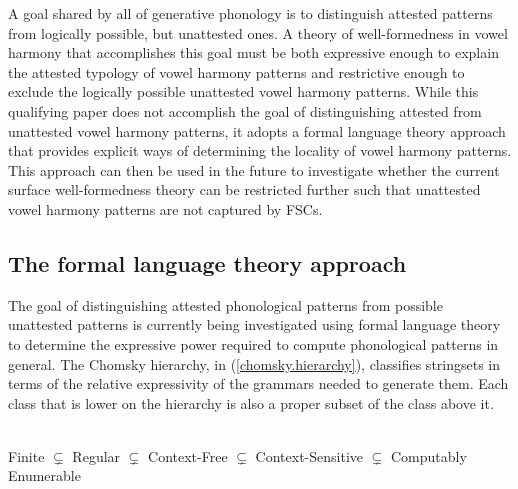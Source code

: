 \documentclass[,doc,floatsintext]{apa6}
\theoremstyle{definition}
\theoremstyle{definition}
\theoremstyle{definition}
\theoremstyle{remark}
\begin{document}
A goal shared by all of generative phonology is to distinguish attested
patterns from logically possible, but unattested ones. A theory of
well-formedness in vowel harmony that accomplishes this goal must be
both expressive enough to explain the attested typology of vowel harmony
patterns and restrictive enough to exclude the logically possible
unattested vowel harmony patterns. While this qualifying paper does not
accomplish the goal of distinguishing attested from unattested vowel
harmony patterns, it adopts a formal language theory approach that
provides explicit ways of determining the locality of vowel harmony
patterns. This approach can then be used in the future to investigate
whether the current surface well-formedness theory can be restricted
further such that unattested vowel harmony patterns are not captured by
FSCs.

\subsection{The formal language theory
approach}\label{the-formal-language-theory-approach}

The goal of distinguishing attested phonological patterns from possible
unattested patterns is currently being investigated using formal
language theory to determine the expressive power required to compute
phonological patterns in general. The Chomsky hierarchy, in
(\ref{chomsky.hierarchy}), classifies stringsets in terms of the
relative expressivity of the grammars needed to generate them. Each
class that is lower on the hierarchy is also a proper subset of the
class above it.

\begin{exe}
\label{chomsky.hierarchy} \\ 
Finite $\subsetneq$ Regular $\subsetneq$ Context-Free $\subsetneq$ Context-Sensitive $\subsetneq$ Computably Enumerable
\end{exe}
\end{document}
